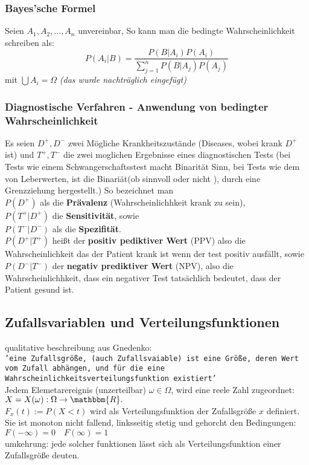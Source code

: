\documentclass[a4paper]{article}
\theoremstyle{definition}
\theoremstyle{remark}
\begin{document}
\subsubsection{Bayes'sche Formel}
\label{ssub:bayes_sche_formel}

Seien $A_1,A_2,\dots,A_n$ unvereinbar, So kann man die bedingte Wahrscheinlichkeit schreiben als:
\begin{equation}
  P(A_i|B)=\frac{P(B|A_i)P(A_i)}{\sum_{j=1}^n P(B|A_j)P(A_j)}
\end{equation} 
mit $ \bigcup A_i=\Omega $
\textit{(das wurde nachträglich eingefügt)}

\subsubsection{Diagnostische Verfahren - Anwendung von bedingter Wahrscheinlichkeit}
\label{ssub:diagnostische_verfahren_anwendung_von_bedingter_wahrscheinlichkeit}

Es seien $D^+,D^-$ zwei Mögliche Krankheitszustände (Diseases, wobei krank $D^+$ ist) und $T^+,T^-$ 
die zwei moglichen Ergebnisse eines diagnostischen Tests 
(bei Tests wie einem Schwangerschaftsstest macht Binarität Sinn, bei Tests wie dem von Leberwerten, ist die Binariät(ob sinnvoll oder nicht ), durch eine Grenzziehung hergestellt.) 
So bezeichnet man \\
$P(D^+)$ als die \textbf{Prävalenz} (Wahrscheinlichhkeit krank zu sein),\\
$P(T^+|D^+)$ die \textbf{Sensitivität}, sowie\\
$P(T^-|D^-)$ als die \textbf{Spezifität}.\\
$P(D^+|T^+)$ heißt der \textbf{positiv pediktiver Wert} (PPV) also die Wahrscheinlichkeit das der Patient krank ist wenn der test positiv ausfällt, sowie\\
$P(D^-|T^-)$ der \textbf{negativ prediktiver Wert} (NPV), also die Wahrscheinlichhkeit, dass ein negativer Test tatsächlich bedeutet, dass der Patient gesund ist.\\
  \subsection{Zufallsvariablen und Verteilungsfunktionen} %
\label{sub:subsection_name}


qualitative beschreibung aus Gnedenko:\\
\texttt{'eine Zufallsgröße, (auch Zufallsvaiable) ist eine Größe, deren Wert vom Zufall abhängen, und für die eine Wahrscheinlichkeitsverteilungsfunktion existiert'\\}
Jedem Elemetarereignis (unzerteilbar) $\omega \in \Omega $,  wird eine reele Zahl zugeordnet:\\
$X=X(\omega ):\Omega  \rightarrow \mathbbm{R}.$\\
$F_x(t):= P(X<t)$ wird als Verteilungsfunktion der Zufallsgröße $x$ definiert. Sie ist monoton nicht fallend, linksseitig stetig und gehorcht den Bedingungen: $F(-\infty)=0\quad F(\infty)=1$
\\
umkehrung: jede solcher funktionen lässt sich als Verteilungsfunktion einer Zufallsgröße deuten.
\end{document}
